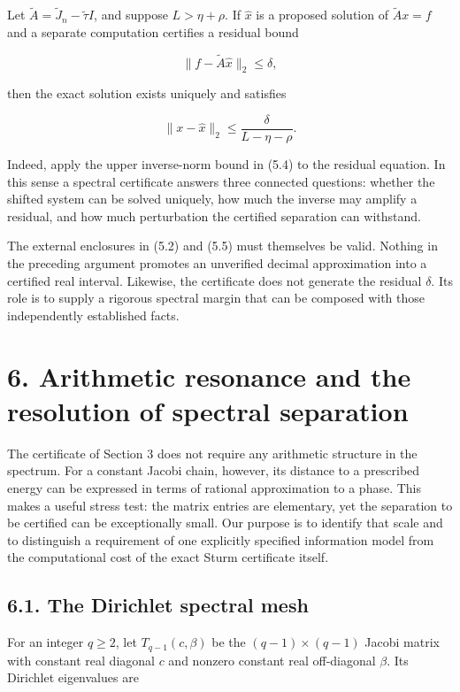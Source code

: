 \documentclass[
  11pt,
]{article}
\begin{document}
Let \(\widetilde A=\widetilde J_n-\widetilde\tau I\), and suppose
\(L>\eta+\rho\). If \(\widehat x\) is a proposed solution of
\(\widetilde A x=f\) and a separate computation certifies a residual
bound

\[
\|f-\widetilde A\widehat x\|_2\le\delta,
\]

then the exact solution exists uniquely and satisfies

\[
\boxed{
\|x-\widehat x\|_2
\le\frac{\delta}{L-\eta-\rho}.}
\tag{5.8}
\]

Indeed, apply the upper inverse-norm bound in (5.4) to the residual
equation. In this sense a spectral certificate answers three connected
questions: whether the shifted system can be solved uniquely, how much
the inverse may amplify a residual, and how much perturbation the
certified separation can withstand.

The external enclosures in (5.2) and (5.5) must themselves be valid.
Nothing in the preceding argument promotes an unverified decimal
approximation into a certified real interval. Likewise, the certificate
does not generate the residual \(\delta\). Its role is to supply a
rigorous spectral margin that can be composed with those independently
established facts.

\section{6. Arithmetic resonance and the resolution of spectral
separation}\label{arithmetic-resonance-and-the-resolution-of-spectral-separation}

The certificate of Section 3 does not require any arithmetic structure
in the spectrum. For a constant Jacobi chain, however, its distance to a
prescribed energy can be expressed in terms of rational approximation to
a phase. This makes a useful stress test: the matrix entries are
elementary, yet the separation to be certified can be exceptionally
small. Our purpose is to identify that scale and to distinguish a
requirement of one explicitly specified information model from the
computational cost of the exact Sturm certificate itself.

\subsection{6.1. The Dirichlet spectral
mesh}\label{the-dirichlet-spectral-mesh}

For an integer \(q\ge2\), let \(T_{q-1}(c,\beta)\) be the
\((q-1)\times(q-1)\) Jacobi matrix with constant real diagonal \(c\) and
nonzero constant real off-diagonal \(\beta\). Its Dirichlet eigenvalues
are
\end{document}
